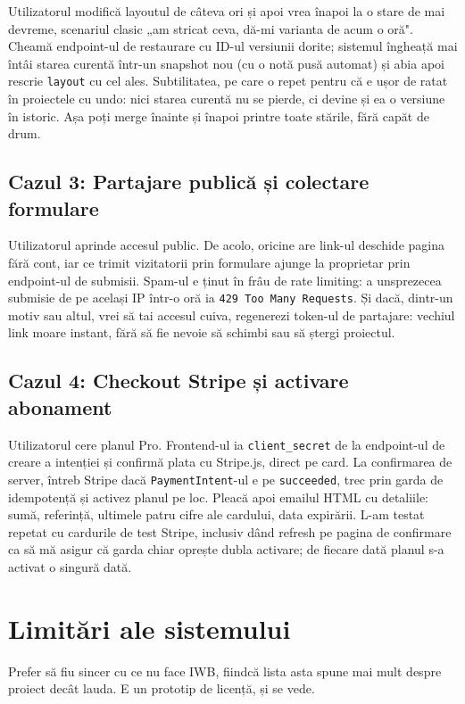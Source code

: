 \documentclass[12pt,a4paper]{report}
\begin{document}
Utilizatorul modifică layoutul de câteva ori și apoi vrea înapoi la o stare de mai
devreme, scenariul clasic „am stricat ceva, dă-mi varianta de acum o oră". Cheamă
endpoint-ul de restaurare cu ID-ul versiunii dorite; sistemul îngheață mai întâi starea
curentă într-un snapshot nou (cu o notă pusă automat) și abia apoi rescrie
\texttt{layout} cu cel ales. Subtilitatea, pe care o repet pentru că e ușor de ratat în
proiectele cu undo: nici starea curentă nu se pierde, ci devine și ea o versiune în
istoric. Așa poți merge înainte și înapoi printre toate stările, fără capăt de drum.

\subsection{Cazul 3: Partajare publică și colectare formulare}

Utilizatorul aprinde accesul public. De acolo, oricine are link-ul deschide pagina
fără cont, iar ce trimit vizitatorii prin formulare ajunge la proprietar prin
endpoint-ul de submisii. Spam-ul e ținut în frâu de rate limiting: a unsprezecea
submisie de pe același IP într-o oră ia \texttt{429 Too Many Requests}. Și dacă, dintr-un
motiv sau altul, vrei să tai accesul cuiva, regenerezi token-ul de partajare: vechiul
link moare instant, fără să fie nevoie să schimbi sau să ștergi proiectul.

\subsection{Cazul 4: Checkout Stripe și activare abonament}

Utilizatorul cere planul Pro. Frontend-ul ia \texttt{client\_secret} de la endpoint-ul
de creare a intenției și confirmă plata cu Stripe.js, direct pe card. La confirmarea de
server, întreb Stripe dacă \texttt{PaymentIntent}-ul e pe \texttt{succeeded}, trec prin
garda de idempotență și activez planul pe loc. Pleacă apoi emailul HTML cu detaliile:
sumă, referință, ultimele patru cifre ale cardului, data expirării. L-am testat repetat
cu cardurile de test Stripe, inclusiv dând refresh pe pagina de confirmare ca să mă
asigur că garda chiar oprește dubla activare; de fiecare dată planul s-a activat o
singură dată.

\section{Limitări ale sistemului}

Prefer să fiu sincer cu ce nu face IWB, fiindcă lista asta spune mai mult despre
proiect decât lauda. E un prototip de licență, și se vede.
\end{document}
